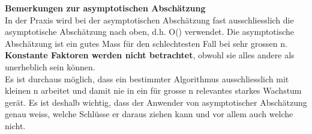\textbf{Bemerkungen zur asymptotischen Abschätzung}\\
In der Praxis wird bei der asymptotischen Abschätzung fast ausschliesslich die asymptotische Abschätzung nach
oben, d.h. O() verwendet. Die asymptotische Abschätzung ist ein gutes Mass für den schlechtesten Fall bei sehr
grossen n. \textbf{Konstante Faktoren werden nicht betrachtet}, obwohl sie alles andere als unerheblich sein können.\\
Es ist durchaus möglich, dass ein bestimmter Algorithmus ausschliesslich mit kleinen n arbeitet und damit nie in ein
für grosse n relevantes starkes Wachstum gerät. Es ist deshalb wichtig, dass der Anwender von asymptotischer Abschätzung
genau weiss, welche Schlüsse er daraus ziehen kann und vor allem auch welche nicht.\\

